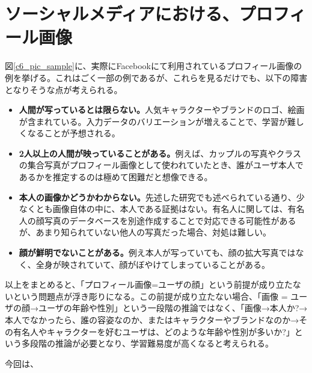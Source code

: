 \section{ソーシャルメディアにおける、プロフィール画像}
図\ref{c6_pic_sample}に、実際にFacebookにて利用されているプロフィール画像の例を挙げる。これはごく一部の例であるが、これらを見るだけでも、以下の障害となりそうな点が考えられる。
\begin{itemize}
\item \textbf{人間が写っているとは限らない。}人気キャラクターやブランドのロゴ、絵画が含まれている。入力データのバリエーションが増えることで、学習が難しくなることが予想される。
\item \textbf{2人以上の人間が映っていることがある。}例えば、カップルの写真やクラスの集合写真がプロフィール画像として使われていたとき、誰がユーザ本人であるかを推定するのは極めて困難だと想像できる。
\item \textbf{本人の画像かどうかわからない。}先述した研究\cite{pennacchiotti2011a-machine}でも述べられている通り、少なくとも画像自体の中に、本人である証拠はない。有名人に関しては、有名人の顔写真のデータベースを別途作成することで対応できる可能性があるが、あまり知られていない他人の写真だった場合、対処は難しい。
\item \textbf{顔が鮮明でないことがある。}例え本人が写っていても、顔の拡大写真ではなく、全身が映されていて、顔がぼやけてしまっていることがある。
\end{itemize}
以上をまとめると、「プロフィール画像=ユーザの顔」という前提が成り立たないという問題点が浮き彫りになる。この前提が成り立たない場合、「画像 = ユーザの顔→ユーザの年齢や性別」という一段階の推論ではなく、「画像→本人か?→本人でなかったら、誰の容姿なのか、またはキャラクターやブランドなのか→その有名人やキャラクターを好むユーザは、どのような年齢や性別が多いか?」という多段階の推論が必要となり、学習難易度が高くなると考えられる。\par
今回は、

